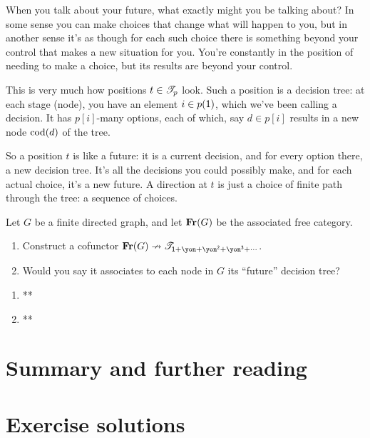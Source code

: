 \documentclass[Book-Poly]{subfiles}
\begin{document}
When you talk about your future, what exactly might you be talking about? In some sense you can make choices that change what will happen to you, but in another sense it's as though for each such choice there is something beyond your control that makes a new situation for you. You're constantly in the position of needing to make a choice, but its results are beyond your control.

This is very much how positions $t\in\mathscr{T}_{p}$ look. Such a position is a decision tree: at each stage (node), you have an element $i\in p(\textsf{1})$, which we've been calling a decision. It has $p[i]$-many options, each of which, say $d\in p[i]$ results in a new node $\operatorname{cod}(d)$ of the tree.

So a position $t$ is like a future: it is a current decision, and for every option there, a new decision tree. It's all the decisions you could possibly make, and for each actual choice, it's a new future. A direction at $t$ is just a choice of finite path through the tree: a sequence of choices. 

\begin{exercise}
Let $G$ be a finite directed graph, and let $\mathbf{Fr}(G)$ be the associated free category. 
\begin{enumerate}
	\item Construct a cofunctor $\Cat{Fr}(G)\cof\cofree{\1+\yon+\yon^\2+\yon^\3+\cdots}$.
	\item Would you say it associates to each node in $G$ its ``future'' decision tree?
\qedhere
\end{enumerate}
\begin{solution}
\begin{enumerate}
    \item **
    \item **
\end{enumerate}
\end{solution}
\end{exercise}




\section{Summary and further reading}


\section{Exercise solutions}
{\footnotesize
}
\end{document}
